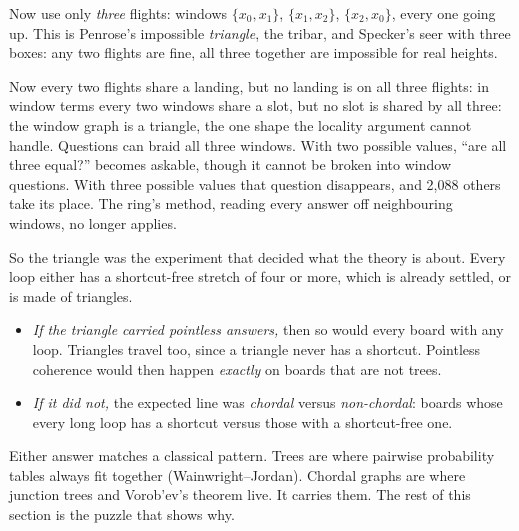 \documentclass[11pt]{article}
\theoremstyle{plain}
\theoremstyle{definition}
\begin{document}
Now use only \emph{three} flights: windows $\{x_0,x_1\}$, $\{x_1,x_2\}$,
$\{x_2,x_0\}$, every one going up. This is Penrose's impossible \emph{triangle},
the tribar, and Specker's seer with three boxes: any two flights are fine, all
three together are impossible for real heights.
\begin{center}
\end{center}
\noindent Now every two flights share a landing, but no landing is on all three
flights: in window terms every two windows share a slot, but no slot is
shared by all three:
the window graph is a triangle, the one shape the locality argument cannot
handle.
Questions can braid all three windows. With two possible values, ``are all three
equal?'' becomes askable, though it cannot be broken into window questions. With
three possible values that question disappears, and 2{,}088 others take its
place. The ring's method, reading every answer off neighbouring windows, no
longer applies.

So the triangle was the experiment that decided what the theory is about. Every
loop either has a shortcut-free stretch of four or more, which is already
settled, or is made of triangles.
\begin{itemize}[nosep]
  \item \emph{If the triangle carried pointless answers,} then so would every board
    with any loop. Triangles travel too, since a triangle never has a shortcut.
    Pointless coherence would then happen \emph{exactly} on boards that are not
    trees.
  \item \emph{If it did not,} the expected line was \emph{chordal} versus
    \emph{non-chordal}: boards whose every long loop has a shortcut versus those
    with a shortcut-free one.
\end{itemize}
Either answer matches a classical pattern. Trees are where pairwise probability
tables always fit together (Wainwright--Jordan). Chordal graphs are where junction
trees and Vorob'ev's theorem live.
It carries them. The rest of this section is the puzzle that shows why.
\end{document}
